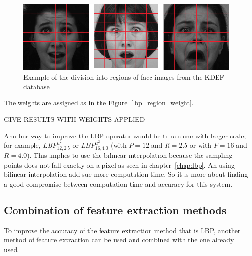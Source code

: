 \begin{figure}[!h]
\begin{center}
\noindent \includegraphics[scale=0.5]{figures/implementation_weight_example} 
\newline
\caption{Example of the division into regions of face images from the KDEF database}
\label{implementation_weight_example}
\end{center} 
\end{figure}

\noindent The weights are assigned as in the Figure~\ref{lbp_region_weight}. 
\newline

\noindent GIVE RESULTS WITH WEIGHTS APPLIED
\newline

\noindent Another way to improve the LBP operator would be to use one with larger scale; for example, $ LBP_{12,2.5}^{u^2} $ or $ LBP_{16,4.0}^{u^2} $ (with $ P = 12 $ and $ R = 2.5 $ or with $ P = 16 $ and $ R = 4.0 $). This implies to use the bilinear interpolation because the sampling points does not fall exactly on a pixel as seen in chapter~\ref{chap:lbp}. An using bilinear interpolation add sue more computation time. So it is more about finding a good compromise between computation time and accuracy for this system.
\newline

\subsection{Combination of feature extraction methods}

\vspace{\baselineskip}
\noindent To improve the accuracy of the feature extraction method that is LBP, another method of feature extraction can be used and combined with the one already used. 
\newline

